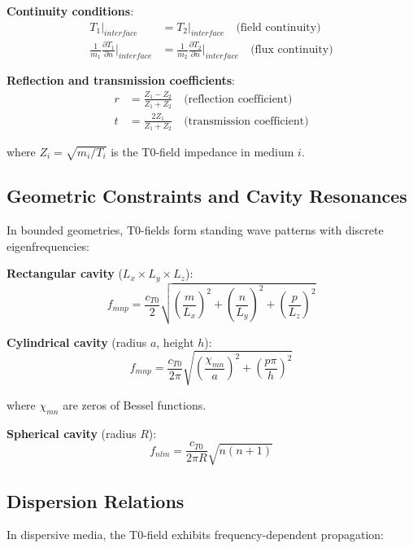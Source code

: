 \documentclass[12pt,a4paper]{article}
\begin{document}
	\textbf{Continuity conditions}:
	\begin{align}
		T_1|_{interface} &= T_2|_{interface} \quad \text{(field continuity)} \\
		\frac{1}{m_1} \frac{\partial T_1}{\partial n}\bigg|_{interface} &= \frac{1}{m_2} \frac{\partial T_2}{\partial n}\bigg|_{interface} \quad \text{(flux continuity)}
	\end{align}
	
	\textbf{Reflection and transmission coefficients}:
	\begin{align}
		r &= \frac{Z_1 - Z_2}{Z_1 + Z_2} \quad \text{(reflection coefficient)} \\
		t &= \frac{2Z_1}{Z_1 + Z_2} \quad \text{(transmission coefficient)}
	\end{align}
	
	where $Z_i = \sqrt{m_i/T_i}$ is the T0-field impedance in medium $i$.
	
	\subsection{Geometric Constraints and Cavity Resonances}
	
	In bounded geometries, T0-fields form standing wave patterns with discrete eigenfrequencies:
	
	\textbf{Rectangular cavity} ($L_x \times L_y \times L_z$):
	\begin{equation}
		f_{mnp} = \frac{c_{T0}}{2} \sqrt{\left(\frac{m}{L_x}\right)^2 + \left(\frac{n}{L_y}\right)^2 + \left(\frac{p}{L_z}\right)^2}
	\end{equation}
	
	\textbf{Cylindrical cavity} (radius $a$, height $h$):
	\begin{equation}
		f_{mnp} = \frac{c_{T0}}{2\pi} \sqrt{\left(\frac{\chi_{mn}}{a}\right)^2 + \left(\frac{p\pi}{h}\right)^2}
	\end{equation}
	
	where $\chi_{mn}$ are zeros of Bessel functions.
	
	\textbf{Spherical cavity} (radius $R$):
	\begin{equation}
		f_{nlm} = \frac{c_{T0}}{2\pi R} \sqrt{n(n+1)}
	\end{equation}
	
	\subsection{Dispersion Relations}
	
	In dispersive media, the T0-field exhibits frequency-dependent propagation:
	
\end{document}
